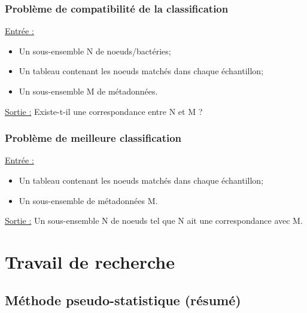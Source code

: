 \documentclass{beamer}
\begin{document}

\begin{frame}
\frametitle{Problème de compatibilité de la classification}

\uline{Entrée :} \begin{itemize} \item Un sous-ensemble N de noeuds/bactéries; \item Un tableau contenant les noeuds matchés dans chaque échantillon; \item Un sous-ensemble M de métadonnées. \end{itemize}

\bigskip
\uline{Sortie :} Existe-t-il une correspondance entre N et M ?


\end{frame}

\begin{frame}
\frametitle{Problème de meilleure classification}

\uline{Entrée :} \begin{itemize} \item Un tableau contenant les noeuds matchés dans chaque échantillon; \item Un sous-ensemble de métadonnées M. \end{itemize}

\bigskip
\uline{Sortie :} Un sous-ensemble N de noeuds tel que N ait une correspondance avec M.


\end{frame}

\section{Travail de recherche}

\begin{frame}
\tableofcontents[currentsection]
\end{frame}

\subsection{Méthode pseudo-statistique (résumé)}
\end{document}

